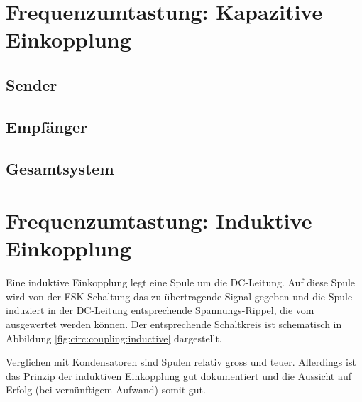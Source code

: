 \section{Frequenzumtastung: Kapazitive Einkopplung}
\label{sec:simu:fsk:capacitive}

\subsection{Sender}
\label{sec:simu:fsk:capacitive:transmitter}

\subsection{Empf\"anger}
\label{sec:simu:fsk:capacitive:receiver}

\subsection{Gesamtsystem}
\label{sec:simu:fsk:capacitive:system}

\section{Frequenzumtastung: Induktive Einkopplung}
\label{sec:simu:fsk:inductive}

Eine induktive Einkopplung legt eine  Spule um die DC-Leitung. Auf diese Spule
wird von der FSK-Schaltung das zu  \"ubertragende Signal gegeben und die Spule
induziert in  der DC-Leitung  entsprechende Spannungs-Rippel, die  vom \Master
ausgewertet werden k\"onnen. Der entsprechende  Schaltkreis ist schematisch in
Abbildung \ref{fig:circ:coupling:inductive} dargestellt.

Verglichen mit  Kondensatoren sind Spulen relativ  gross und teuer. Allerdings
ist das Prinzip  der induktiven Einkopplung gut dokumentiert  und die Aussicht
auf Erfolg (bei vern\"unftigem Aufwand) somit gut.

